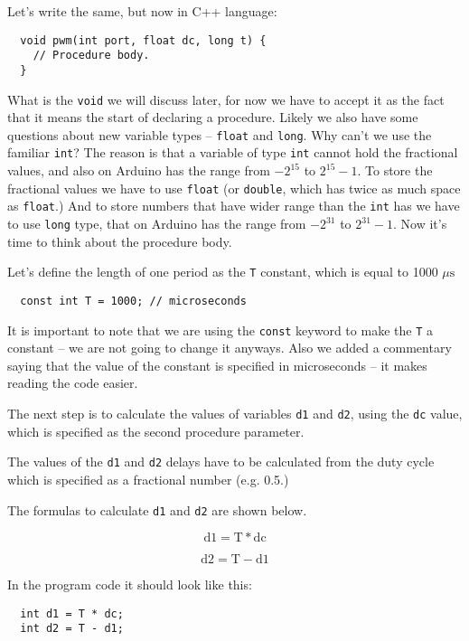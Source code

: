 \documentclass[../sparc.tex]{subfiles}
\begin{document}
Let's write the same, but now in C++ language:

\begin{verbatim}
  void pwm(int port, float dc, long t) {
    // Procedure body.
  }
\end{verbatim}

What is the \texttt{void} we will discuss later, for now we have to accept it as
the fact that it means the start of declaring a procedure.  Likely we also have
some questions about new variable types -- \texttt{float} and \texttt{long}.  Why
can't we use the familiar \texttt{int}?  The reason is that a variable of type
\texttt{int} cannot hold the fractional values, and also on Arduino has the
range from $-2^{15}$ to $2^{15} - 1$.  To store the fractional values we have to
use \texttt{float} (or \texttt{double}, which has twice as much space as
\texttt{float}.)  And to store numbers that have wider range than the
\texttt{int} has we have to use \texttt{long} type, that on Arduino has the
range from $-2^{31}$ to $2^{31} - 1$.  Now it's time to think about the
procedure body.

Let's define the length of one period as the \texttt{T} constant, which is equal
to 1000 $\mu\mbox{s}$

\begin{verbatim}
  const int T = 1000; // microseconds
\end{verbatim}

It is important to note that we are using the \texttt{const} keyword to make the
\texttt{T} a constant -- we are not going to change it anyways.  Also we added a
commentary saying that the value of the constant is specified in microseconds --
it makes reading the code easier.

The next step is to calculate the values of variables \texttt{d1} and
\texttt{d2}, using the \texttt{dc} value, which is specified as the second
procedure parameter.

The values of the \texttt{d1} and \texttt{d2} delays have to be calculated from
the duty cycle which is specified as a fractional number (e.g. 0.5.)

The formulas to calculate \texttt{d1} and \texttt{d2} are shown below.

\begin{equation}
  \mbox{d1} = \mbox{T} * \mbox{dc}
  \label{A formula to calculate the time of ``HIGH'' value.}
\end{equation}

\begin{equation}
  \mbox{d2} = \mbox{T} - \mbox{d1}
  \label{A formula to calculate the time of ``LOW value.}
\end{equation}

In the program code it should look like this:

\begin{verbatim}
  int d1 = T * dc;
  int d2 = T - d1;
\end{verbatim}
\end{document}
